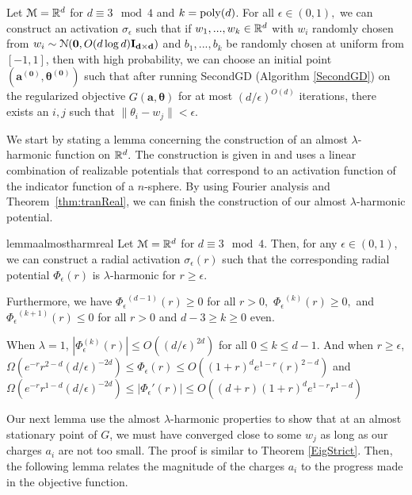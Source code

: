 %
%
\begin{theorem}\label{almostHarmSGD}
  Let $\mathcal{M} = {\mathbb{R}}^{d}$ for $d \equiv 3 \mod 4$ and
  $k = \mathrm{poly}(d)$. For all $\epsilon \in (0,1),$ we can construct an
  activation $\sigma_\epsilon$ such that if $w_1,...,w_k \in {\mathbb{R}}^d$
  with $w_i$ randomly chosen from
  $w_i \sim \mathcal{N}({\bf 0}, O(d\log d){\bf I_{d\times d}})$ and
  $b_1,...,b_k$ be randomly chosen at uniform from $[-1,1]$, then with
  high probability, we can choose an initial point
  $(\boldsymbol{a^{(0)}, \theta^{(0)}})$ such that after running
  SecondGD (Algorithm \ref{SecondGD}) on the regularized objective
  $G(\boldsymbol{a,\theta})$ for at most $(d/\epsilon)^{O(d)}$
  iterations, there exists an $i, j$ such that
  $\|\theta_i - w_j\| < \epsilon$.
\end{theorem}
%
We start by stating a lemma concerning the construction of an almost
$\lambda$-harmonic function on ${\mathbb{R}}^d.$ The construction is given in  and uses a linear combination of realizable potentials that correspond to an activation function of the indicator function of a $n$-sphere. By using Fourier analysis and Theorem~\ref{thm:tranReal}, we can finish the construction of our almost $\lambda$-harmonic potential.%
%
\begin{restatable}{lemma}{almostharmreal}\label{almostHarmReal}
  Let $\mathcal{M} = {\mathbb{R}}^d$ for $d \equiv 3 \mod 4$. Then, for any
  $\epsilon \in (0,1)$, we can construct a radial activation
  $\sigma_\epsilon(r)$ such that the corresponding radial potential
  $\Phi_\epsilon(r)$  is $\lambda$-harmonic for
  $r \geq \epsilon$.

Furthermore, we have ${\Phi_\epsilon}^{(d-1)}(r) \geq 0$ for all $r  > 0,$  ${\Phi_\epsilon}^{(k)}(r) \geq 0,$ and ${\Phi_\epsilon}^{(k+1)}(r)\leq 0$ for all $r > 0$ and $d - 3 \geq k \geq 0 $ even. 

When $\lambda = 1$, $|{\Phi}_\epsilon^{(k)}(r)| \leq O((d/\epsilon)^{2d})$ for all $0 \leq k \leq d-1$. And when $r \geq \epsilon$, $\Omega(e^{-r}r^{2-d}(d/\epsilon)^{-2d}) \leq {\Phi}_\epsilon(r) \leq O((1+r)^de^{1-r}(r)^{2-d})$ and $ \Omega(e^{-r}r^{1-d}(d/\epsilon)^{-2d}) \leq |{\Phi}_\epsilon'(r)| \leq O((d+r)(1+ r)^de^{1- r} r^{1-d})$
\end{restatable}
%
%
Our next lemma use the almost $\lambda$-harmonic properties to show that at an almost stationary point of $G$, we must have converged close to some $w_j$ as long as our charges $a_i$ are not too small. The proof is similar to Theorem \ref{EigStrict}. Then, the following lemma relates the magnitude of the charges $a_i$ to the progress made in the objective function. 
